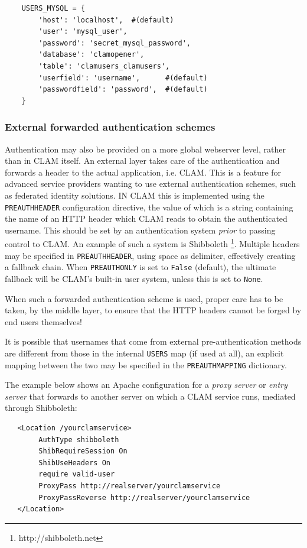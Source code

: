\documentclass[a4paper,12pt,twoside,openright]{report}
\begin{document}
{ \small
\begin{verbatim}
    USERS_MYSQL = {
        'host': 'localhost',  #(default)
        'user': 'mysql_user',        
        'password': 'secret_mysql_password',
        'database': 'clamopener',
        'table': 'clamusers_clamusers',
        'userfield': 'username',      #(default)
        'passwordfield': 'password',  #(default)
    }
\end{verbatim}
}

\subsubsection{External forwarded authentication schemes}

Authentication may also be provided on a more global webserver level, rather
than in CLAM itself. An external layer takes care of the authentication and
forwards a header to the actual application, i.e. CLAM. This is a feature for
advanced service providers wanting to use external authentication schemes, such
as federated identity solutions. IN CLAM this is implemented using the
\texttt{PREAUTHHEADER} configuration directive, the value of which is a string
containing the name of an HTTP header which CLAM reads to obtain the
authenticated username. This should be set by an authentication system
\emph{prior} to passing control to CLAM. An example of such a system is
Shibboleth \footnote{http://shibboleth.net}.  Multiple headers may be specified
in \texttt{PREAUTHHEADER}, using space as delimiter, effectively creating a
fallback chain. When \texttt{PREAUTHONLY} is set to \texttt{False} (default),
the ultimate fallback will be CLAM's built-in user system, unless this is set
to \texttt{None}. 

When such a forwarded authentication scheme is used, proper care has to be
taken, by the middle layer, to ensure that the HTTP headers cannot be forged by
end users themselves!

It is possible that usernames that come from external pre-authentication
methods are different from those in the internal \texttt{USERS} map (if used at
all), an explicit mapping between the two may be specified in the
\texttt{PREAUTHMAPPING} dictionary. 

The example below shows an Apache configuration for a \emph{proxy server} or
\emph{entry server} that forwards to another server on which a CLAM service runs, mediated
through Shibboleth:

{ \small
\begin{verbatim}
   <Location /yourclamservice>
        AuthType shibboleth
        ShibRequireSession On
        ShibUseHeaders On
        require valid-user
        ProxyPass http://realserver/yourclamservice
        ProxyPassReverse http://realserver/yourclamservice
   </Location>
\end{verbatim}
}
\end{document}
